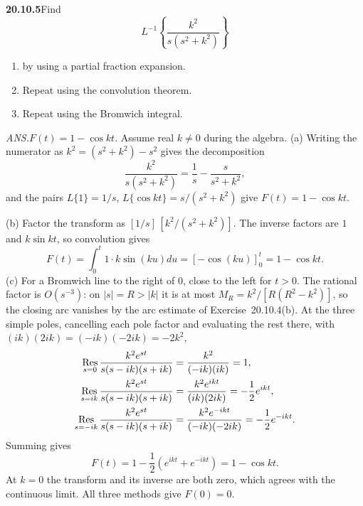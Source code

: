 \par\bigskip
\noindent\textbf{20.10.5}\quad Find
\[
L^{-1}\left\{\frac{k^{2}}{s(s^{2}+k^{2})}\right\}
\]
\begin{enumerate}
\item[(a)] by using a partial fraction expansion.
\item[(b)] Repeat using the convolution theorem.
\item[(c)] Repeat using the Bromwich integral.
\end{enumerate}
\par\nobreak\hfill\emph{ANS.}\enspace$F(t)=1-\cos kt$.
\solution
Assume real $k\ne0$ during the algebra.
(a) Writing the numerator as $k^2=(s^2+k^2)-s^2$ gives the
decomposition
\[
\frac{k^2}{s(s^2+k^2)}=\frac1s-\frac{s}{s^2+k^2},
\]
and the pairs $L\{1\}=1/s$, $L\{\cos kt\}=s/(s^2+k^2)$ give
$F(t)=1-\cos kt$.

(b) Factor the transform as
$[1/s]\,[k^2/(s^2+k^2)]$. The inverse factors are $1$ and
$k\sin kt$, so convolution gives
\[
F(t)=\int_0^t 1\cdot k\sin(ku)du=[-\cos(ku)]_0^t=1-\cos kt.
\]
(c) For a Bromwich line to the right of $0$, close to the
left for $t>0$. The rational factor is $O(s^{-3})$: on
$|s|=R>|k|$ it is at most $M_R=k^2/[R(R^2-k^2)]$, so the closing
arc vanishes by the arc estimate of Exercise~20.10.4(b). At
the three simple poles, cancelling each pole factor and
evaluating the rest there, with $(ik)(2ik)=(-ik)(-2ik)=-2k^2$,
\begin{align*}
\mathop{\rm Res}_{s=0}\frac{k^2e^{st}}{s(s-ik)(s+ik)}
&=\frac{k^2}{(-ik)(ik)}=1,\\
\mathop{\rm Res}_{s=ik}\frac{k^2e^{st}}{s(s-ik)(s+ik)}
&=\frac{k^2e^{ikt}}{(ik)(2ik)}=-\frac12e^{ikt},\\
\mathop{\rm Res}_{s=-ik}\frac{k^2e^{st}}{s(s-ik)(s+ik)}
&=\frac{k^2e^{-ikt}}{(-ik)(-2ik)}=-\frac12e^{-ikt}.
\end{align*}
Summing gives
\[
\boxed{F(t)=1-\frac12(e^{ikt}+e^{-ikt})=1-\cos kt}.
\]
At $k=0$ the transform and its inverse are both zero, which
agrees with the continuous limit. All three methods give
$F(0)=0$.

